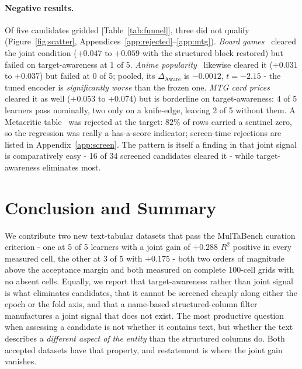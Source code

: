 \documentclass{article}
\newcommand{\daware}{\Delta_{\text{Aware}}}
\begin{document}
\paragraph{Negative results.} Of five candidates gridded [Table~\ref{tab:funnel}], three did not
qualify (Figure~\ref{fig:scatter}, Appendices~\ref{app:rejected}--\ref{app:mtg}). \emph{Board games}~\citep{dataset_board_games} cleared the joint
condition ($+0.047$ to $+0.059$ with the structured block restored) but failed on
target-awareness at 1 of 5. \emph{Anime popularity}~\citep{dataset_anime_popularity} likewise cleared it ($+0.031$ to $+0.037$)
but failed at 0 of 5; pooled, its $\daware$ is $-0.0012$, $t = -2.15$ - the tuned encoder is
\emph{significantly worse} than the frozen one. \emph{MTG card prices}~\citep{dataset_mtg_card_prices} cleared it as well
($+0.053$ to $+0.074$) but is borderline on target-awareness: 4 of 5 learners pass nominally,
two only on a knife-edge, leaving 2 of 5 without them. A Metacritic table~\citep{dataset_metacritic_scored} was rejected at the
target: $82\%$ of rows carried a sentinel zero, so the regression was really a has-a-score
indicator; screen-time rejections are listed in Appendix~\ref{app:screen}. The pattern is itself
a finding in that joint signal is comparatively easy - 16 of 34 screened candidates cleared it -
while target-awareness eliminates most.
\section{Conclusion and Summary}

We contribute two new text-tabular datasets that pass the MulTaBench curation criterion - one
at 5 of 5 learners with a joint gain of $+0.288$ $R^2$ positive in every measured cell, the
other at 3 of 5 with $+0.175$ - both two orders of magnitude above the acceptance margin and
both measured on complete 100-cell grids with no absent cells. Equally, we report that
target-awareness rather than joint signal is what eliminates candidates, that it cannot be
screened cheaply along either the epoch or the fold axis, and that a name-based
structured-column filter manufactures a joint signal that does not exist. The most productive
question when assessing a candidate is not whether it contains text, but whether the text
describes a \emph{different aspect of the entity} than the structured columns do. Both accepted
datasets have that property, and restatement is where the joint gain vanishes.
\end{document}
